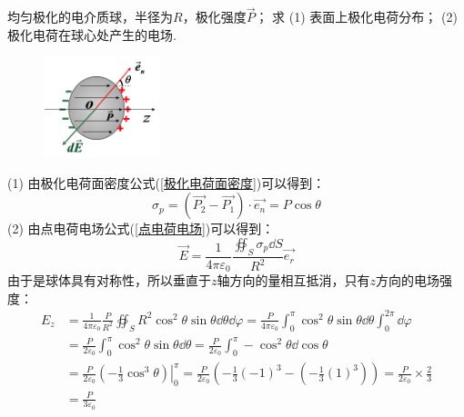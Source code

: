 \documentclass[cn,hazy,blue,14pt,normal]{elegantnote}
\numberwithin{equation}{section}
\begin{document}
\begin{example}
	均匀极化的电介质球，半径为$R$，极化强度$\vec{P}$；
	求 (1) 表面上极化电荷分布；
	(2) 极化电荷在球心处产生的电场.
\end{example}

\begin{figure}
	\includegraphics[width=0.3\textwidth]{image/极化电荷例题.png}
\end{figure}
(1) 由极化电荷面密度公式(\ref{极化电荷面密度})可以得到：
$$ \sigma_p = (\vec{P_2}-\vec{P_1})\cdot \vec{e_{n}} = P\cos\theta $$
(2) 由点电荷电场公式(\ref{点电荷电场})可以得到：
$$ \vec{E} = \frac{1}{4\pi\varepsilon_0}\frac{\oiint_S \sigma_p \dd S}{R^2}\vec{e_r} $$
由于是球体具有对称性，所以垂直于$z$轴方向的量相互抵消，只有$z$方向的电场强度：
\begin{align*}
	E_z &= \frac{1}{4\pi\varepsilon_0}\frac{P}{R^2}\oiint_S R^2 \cos^2 \theta \sin \theta \dd \theta \dd \varphi
		= \frac{P}{4 \pi \varepsilon_0}\int_{0}^{\pi} \cos^2 \theta \sin \theta \dd \theta \int_{0}^{2\pi} \dd \varphi\\
		&= \frac{P}{2 \varepsilon_0}\int_{0}^{\pi} \cos^2 \theta \sin \theta \dd \theta 
		= \frac{P}{2 \varepsilon_0}\int_{0}^{\pi} - \cos^2 \theta \dd \cos \theta \\
		&= \frac{P}{2 \varepsilon_0}\left.\left(-\frac{1}{3}\cos^3 \theta\right)\right|_{0}^{\pi}
		= \frac{P}{2 \varepsilon_0}\left(-\frac 13 (-1)^3 - (- \frac 13 (1)^3)\right)
		= \frac{P}{2 \varepsilon_0} \times \frac 23\\
		&= \frac{P}{3 \varepsilon_0}
\end{align*}
\end{document}
